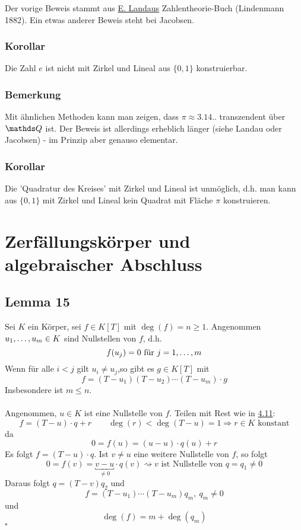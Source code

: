 Der vorige Beweis stammt aus \uline{E. Landaus} Zahlentheorie-Buch (Lindenmann 1882).
Ein etwas anderer Beweis steht bei Jacobsen.

\subsubsection*{Korollar}
Die Zahl $e$ ist nicht mit Zirkel und Lineal aus $\{0,1\}$  konstruierbar.

\subsubsection*{Bemerkung}
Mit ähnlichen Methoden kann man zeigen, dass $\pi\approx 3.14..$ transzendent über $\Q$ ist.
Der Beweis ist allerdings erheblich länger (siehe Landau oder Jacobsen) - im Prinzip aber genauso elementar.

\subsubsection*{Korollar}
Die 'Quadratur des Kreises' mit Zirkel und Lineal ist unmöglich, d.h. man kann aus $\{0,1\}$ mit Zirkel und Lineal kein Quadrat mit Fläche $\pi$ konstruieren.


\newpage
\section{Zerfällungskörper und algebraischer Abschluss}
\label{sec:zerfaellungskoerper_alg_abschluss}
\subsection{Lemma 15}
\label{sub:lemma_15}
Sei $K$ ein Körper, sei $f\in K[T]$ mit $\deg(f)=n\ge1$.
Angenommen $u_1, \dots ,u_m\in K$ sind Nullstellen von $f$, d.h.
\[
f(u_j)=0 \text{ für } j=1, \dots ,m
\]
Wenn für alle $i<j$ gilt $u_i\neq u_j$,so gibt es $g\in K[T]$ mit 
\[
f=(T-u_1)(T-u_2)\cdots(T-u_m)\cdot g
\]
Insbesondere ist $m\le n$.\\

\\
Angenommen, $u\in K$ ist eine Nullstelle von $f$.
Teilen mit Rest wie in \hyperref[sub:polynomdivision]{4.11}:
\[
f=(T-u)\cdot q+r\qquad \deg(r)<\deg(T-u)=1\Rightarrow r\in K\text{ konstant}
\]
da
\[
0=f(u)=(u-u)\cdot q(u)+r
\]
Es folgt $f=(T-u)\cdot q$.
Ist $v\neq u$ eine weitere Nullstelle von $f$, so folgt
\[
0=f(v)=\underbracket{v-u}_{\neq 0}\cdot q(v)\rightsquigarrow v\text{ ist Nullstelle von }q=q_1\neq 0
\]
Daraus folgt $q=(T-v)q_2$ und
\[
f=(T-u_1)\cdots(T-u_m)q_m,~q_m\neq 0
\]
und
\[
\deg(f)=m+\deg(q_m)
\]
\hfill $\square$

